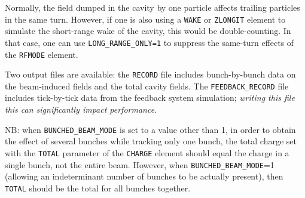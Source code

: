 Normally, the field dumped in the cavity by one particle affects trailing particles in the same turn.
However, if one is also using a \verb|WAKE| or \verb|ZLONGIT| element to simulate the short-range wake of the cavity, this would be double-counting.
In that case, one can use \verb|LONG_RANGE_ONLY=1| to suppress the same-turn effects of the \verb|RFMODE| element.

Two output files are available: the \verb|RECORD| file includes bunch-by-bunch data on the beam-induced fields and the total cavity fields.
The \verb|FEEDBACK_RECORD| file includes tick-by-tick data from the feedback system simulation; {\em writing this file this can significantly impact performance.}

NB: when \verb|BUNCHED_BEAM_MODE| is set to a value other than 1, in order to obtain the effect of several bunches while tracking
only one bunch, the total charge set with the \verb|TOTAL| parameter of the \verb|CHARGE| element should equal the charge in
a single bunch, not the entire beam. However, when \verb|BUNCHED_BEAM_MODE|=1 (allowing an indeterminant number of bunches to be
actually present), then \verb|TOTAL| should be the total for all bunches together.
